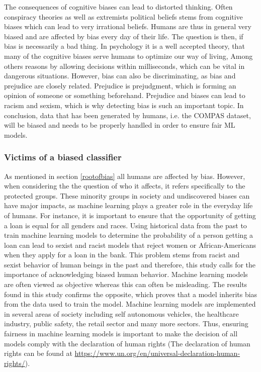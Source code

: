 \documentclass[11pt, fleqn, titlepage]{article}
\begin{document}
	The consequences of cognitive biases can lead to distorted thinking. Often conspiracy theories as well as extremists political beliefs stems from cognitive biases which can lead to very irrational beliefs. \cite{cog_bias} Humans are thus in general very biased and are affected by bias every day of their life. The question is then, if bias is necessarily a bad thing. In psychology it is a well accepted theory, that many of the cognitive biases serve humans to optimize our way of living, Among others reasons by allowing decisions within milliseconds, which can be vital in dangerous situations. \cite{reisberg} However, bias can also be discriminating, as bias and prejudice are closely related. Prejudice is prejudgment, which is forming an opinion of someone or something beforehand. Prejudice and biases can lead to racism and sexism, which is why detecting bias is such an important topic. In conclusion, data that has been generated by humans, i.e. the COMPAS dataset, will be biased and needs to be properly handled in order to ensure fair ML models.
	
	\subsubsection{Victims of a biased classifier}
	As mentioned in section \ref{rootofbias} all humans are affected by bias. However, when considering the the question of who it affects, it refers specifically to the protected groups. These minority groups in society and undiscovered biases can have major impacts, as machine learning plays a greater role in the everyday life of humans. For instance, it is important to ensure that the opportunity of getting a loan is equal for all genders and races. Using historical data from the past to train machine learning models to determine the probability of a person getting a loan can lead to sexist and racist models that reject women or African-Americans when they apply for a loan in the bank. This problem stems from racist and sexist behavior of human beings in the past and therefore, this study calls for the importance of acknowledging biased human behavior. Machine learning models are often viewed as objective whereas this can often be misleading. The results found in this study confirms the opposite, which proves that a model inherits bias from the data used to train the model. Machine learning models are implemented in several areas of society including self autonomous vehicles, the healthcare industry, public safety, the retail sector and many more sectors. Thus, ensuring fairness in machine learning models is important to make the decision of all models comply with the declaration of human rights (The declaration of human rights can be found at \url{https://www.un.org/en/universal-declaration-human-rights/}).
	
\end{document}
